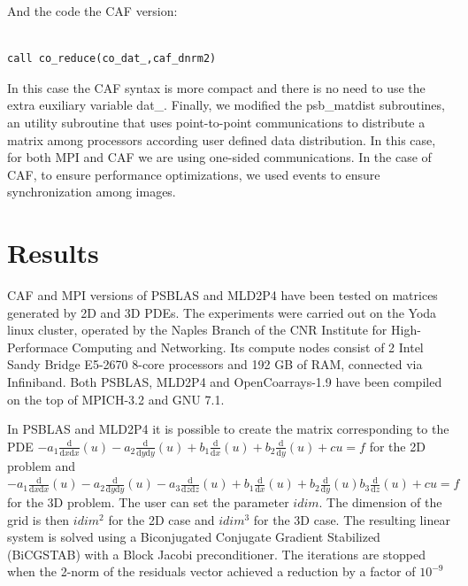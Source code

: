 \documentclass{IOS-Book-Article}
\begin{document}
And the code the CAF version: 

\begin{center}
{\small
\begin{lstlisting}

call co_reduce(co_dat_,caf_dnrm2)

\end{lstlisting}}
\end{center}
In this case the CAF syntax is more compact and there is no need to use the extra euxiliary variable dat\_.
Finally, we modified the psb\_matdist subroutines, an utility subroutine that uses point-to-point communications to distribute a matrix among processors according user defined data distribution. In this case, for both MPI and CAF we are using one-sided communications. In the case of CAF, to ensure performance optimizations, we used events to ensure synchronization among images. 
\section{Results}
CAF and MPI versions of PSBLAS and MLD2P4 have been tested on matrices generated by 2D and 3D PDEs.
The experiments were carried out on the Yoda linux cluster, operated by the Naples Branch of the CNR Institute for High-Performace Computing and Networking. Its compute nodes consist of 2 Intel Sandy Bridge E5-2670 8-core processors and 192 GB of RAM, connected via Infiniband.
Both PSBLAS, MLD2P4 and OpenCoarrays-1.9 have been compiled on the top of MPICH-3.2 and GNU 7.1.

In PSBLAS and MLD2P4 it is possible to create the matrix corresponding to the PDE $
-a_1\frac{\mathrm d}{\mathrm d x \mathrm d x} \left(u \right) -a_2\frac{\mathrm d}{\mathrm d y \mathrm d y} \left(u \right) +b_1\frac{\mathrm d}{\mathrm d x} \left(u \right) +b_2\frac{\mathrm d}{\mathrm d y} \left(u \right) +cu = f
$ for the 2D problem and $
-a_1\frac{\mathrm d}{\mathrm d x \mathrm d x} \left(u \right) -a_2\frac{\mathrm d}{\mathrm d y \mathrm d y} \left(u \right) -a_3\frac{\mathrm d}{\mathrm d z \mathrm d z} \left(u \right) +b_1\frac{\mathrm d}{\mathrm d x} \left(u \right) +b_2\frac{\mathrm d}{\mathrm d y} \left(u \right) b_3\frac{\mathrm d}{\mathrm d z} \left(u \right)
 + cu = f$ for the 3D problem. The user can set the parameter $idim$. The dimension of the grid is then $idim^2$ for the 2D case and $idim^3$ for the 3D case.
 The resulting linear system is solved using a Biconjugated Conjugate Gradient Stabilized (BiCGSTAB) with a Block Jacobi preconditioner. The iterations are stopped when the 2-norm of the residuals vector achieved a reduction by a factor of $10^{-9}$
 
\end{document}
